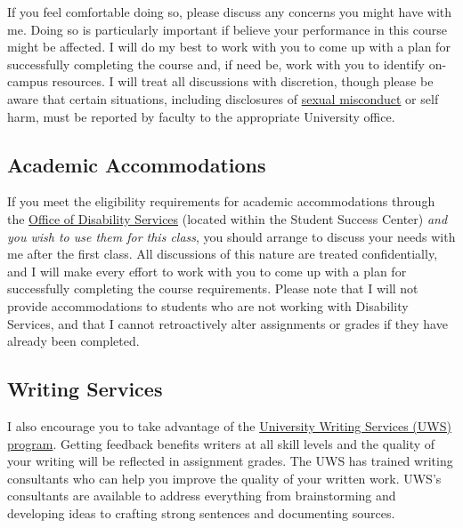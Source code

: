\documentclass[]{book}
\begin{document}
If you feel comfortable doing so, please discuss any concerns you might have with me. Doing so is particularly important if believe your performance in this course might be affected. I will do my best to work with you to come up with a plan for successfully completing the course and, if need be, work with you to identify on-campus resources. I will treat all discussions with discretion, though please be aware that certain situations, including disclosures of \href{/compassionate-coursework.html}{sexual misconduct} or self harm, must be reported by faculty to the appropriate University office.

\hypertarget{academic-accommodations}{%
\subsection{Academic Accommodations}\label{academic-accommodations}}

If you meet the eligibility requirements for academic accommodations through the \href{https://www.slu.edu/life-at-slu/student-success-center/disability-services/index.php}{Office of Disability Services} (located within the Student Success Center) \emph{and you wish to use them for this class}, you should arrange to discuss your needs with me after the first class. All discussions of this nature are treated confidentially, and I will make every effort to work with you to come up with a plan for successfully completing the course requirements. Please note that I will not provide accommodations to students who are not working with Disability Services, and that I cannot retroactively alter assignments or grades if they have already been completed.

\hypertarget{writing-services}{%
\subsection{Writing Services}\label{writing-services}}

I also encourage you to take advantage of the \href{https://www.slu.edu/life-at-slu/student-success-center/academic-support/university-writing-services/index.php}{University Writing Services (UWS) program}. Getting feedback benefits writers at all skill levels and the quality of your writing will be reflected in assignment grades. The UWS has trained writing consultants who can help you improve the quality of your written work. UWS's consultants are available to address everything from brainstorming and developing ideas to crafting strong sentences and documenting sources.
\end{document}
